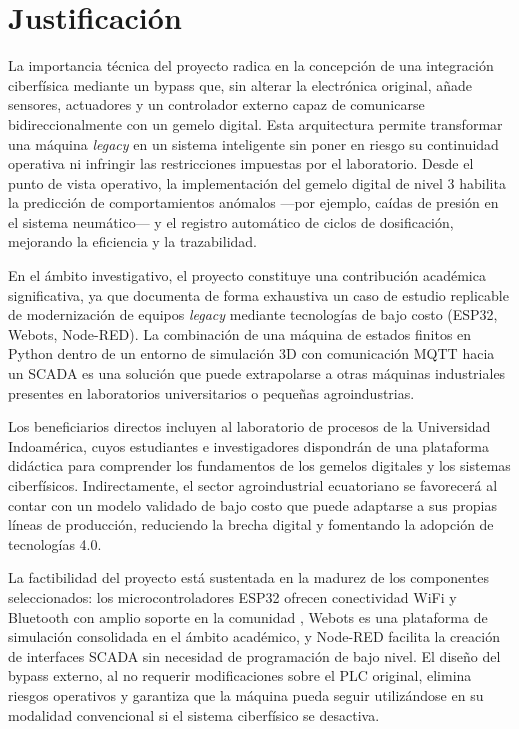 \section{Justificación}
La importancia técnica del proyecto radica en la concepción de una integración ciberfísica mediante un bypass que, sin alterar la electrónica original, añade sensores, actuadores y un controlador externo capaz de comunicarse bidireccionalmente con un gemelo digital. Esta arquitectura permite transformar una máquina \textit{legacy} en un sistema inteligente sin poner en riesgo su continuidad operativa ni infringir las restricciones impuestas por el laboratorio. Desde el punto de vista operativo, la implementación del gemelo digital de nivel 3 habilita la predicción de comportamientos anómalos —por ejemplo, caídas de presión en el sistema neumático— y el registro automático de ciclos de dosificación, mejorando la eficiencia y la trazabilidad.

En el ámbito investigativo, el proyecto constituye una contribución académica significativa, ya que documenta de forma exhaustiva un caso de estudio replicable de modernización de equipos \textit{legacy} mediante tecnologías de bajo costo (ESP32, Webots, Node-RED). La combinación de una máquina de estados finitos en Python dentro de un entorno de simulación 3D con comunicación MQTT hacia un SCADA es una solución que puede extrapolarse a otras máquinas industriales presentes en laboratorios universitarios o pequeñas agroindustrias.

Los beneficiarios directos incluyen al laboratorio de procesos de la Universidad Indoamérica, cuyos estudiantes e investigadores dispondrán de una plataforma didáctica para comprender los fundamentos de los gemelos digitales y los sistemas ciberfísicos. Indirectamente, el sector agroindustrial ecuatoriano se favorecerá al contar con un modelo validado de bajo costo que puede adaptarse a sus propias líneas de producción, reduciendo la brecha digital y fomentando la adopción de tecnologías 4.0.

La factibilidad del proyecto está sustentada en la madurez de los componentes seleccionados: los microcontroladores ESP32 ofrecen conectividad WiFi y Bluetooth con amplio soporte en la comunidad \cite{espressif2024datasheet}, Webots es una plataforma de simulación consolidada en el ámbito académico, y Node-RED facilita la creación de interfaces SCADA sin necesidad de programación de bajo nivel. El diseño del bypass externo, al no requerir modificaciones sobre el PLC original, elimina riesgos operativos y garantiza que la máquina pueda seguir utilizándose en su modalidad convencional si el sistema ciberfísico se desactiva.

